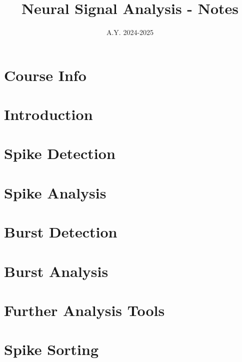 \documentclass[12pt]{article}
\title{Neural Signal Analysis - Notes}
\date{A.Y. 2024-2025}
\begin{document}
\maketitle

\tableofcontents
\newpage

\section*{Course Info}

\newpage

\setcounter{section}{0}
\section{Introduction}
\graphicspath{ {./images/1/} }

\newpage

\section{Spike Detection}
\graphicspath{ {./images/2/} }

\newpage

\section{Spike Analysis}
\graphicspath{ {./images/4/} }

\newpage

\section{Burst Detection}
\graphicspath{ {./images/5/} }

\newpage

\section{Burst Analysis}
\graphicspath{ {./images/6/}{./images/8/} }

\newpage

\section{Further Analysis Tools}
\graphicspath{ {./images/8/} }

\newpage

\section{Spike Sorting}
\graphicspath{ {./images/3/} }

\newpage
\end{document}
